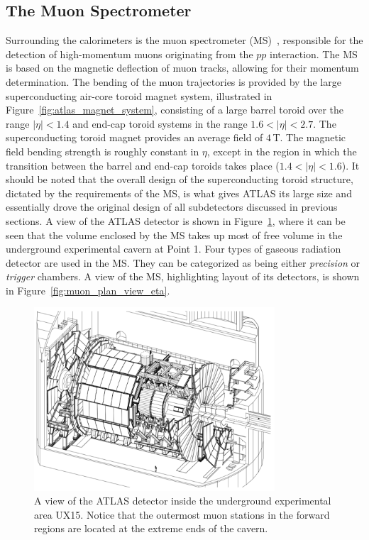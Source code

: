 \subsection{The Muon Spectrometer}
\label{sec:ms}

Surrounding the calorimeters is the muon spectrometer (MS)~\cite{CERN-LHCC-97-022}, responsible
for the detection of high-momentum muons originating from the $pp$ interaction.
The MS is based on the magnetic deflection of muon tracks, allowing for their
momentum determination.
The bending of the muon trajectories is provided by the large
superconducting air-core toroid magnet system, illustrated in Figure~\ref{fig:atlas_magnet_system},
consisting of a large barrel toroid over the range $\lvert \eta \rvert < 1.4$
and end-cap toroid systems in the range $1.6 < \lvert \eta \rvert < 2.7$.
The superconducting toroid magnet provides an average field of $4\,$T.
The magnetic field bending strength is roughly constant in $\eta$, except in the
region in which the transition between the barrel and end-cap toroids takes place
($1.4 < \lvert \eta \rvert < 1.6$).
It should be noted that the overall design of the superconducting toroid structure,
dictated by the requirements of the MS, is what gives ATLAS its large size and essentially
drove the original design of all subdetectors discussed in previous sections.
A view of the ATLAS detector is shown in Figure~\ref{fig:atlas_in_cavern},
where it can be seen that the volume enclosed by the MS takes up most of free volume
in the underground experimental cavern at Point 1.
Four types of gaseous radiation detector are used in the MS.
They can be categorized as being either \textit{precision} or \textit{trigger} chambers.
A view of the MS, highlighting layout of its detectors, is shown in Figure~\ref{fig:muon_plan_view_eta}.

\begin{figure}[!htb]
    \begin{center}
        \includegraphics[width=0.8\textwidth]{figures/chapter2/atlas_in_cavern}
        \caption{
            A view of the ATLAS detector inside the underground experimental area
            UX15.
            Notice that the outermost muon stations in the forward regions are located
            at the extreme ends of the cavern.
            {\color{red}{Should move this figure either above or entirely}}
        }
        \label{fig:atlas_in_cavern}
    \end{center}
\end{figure}

